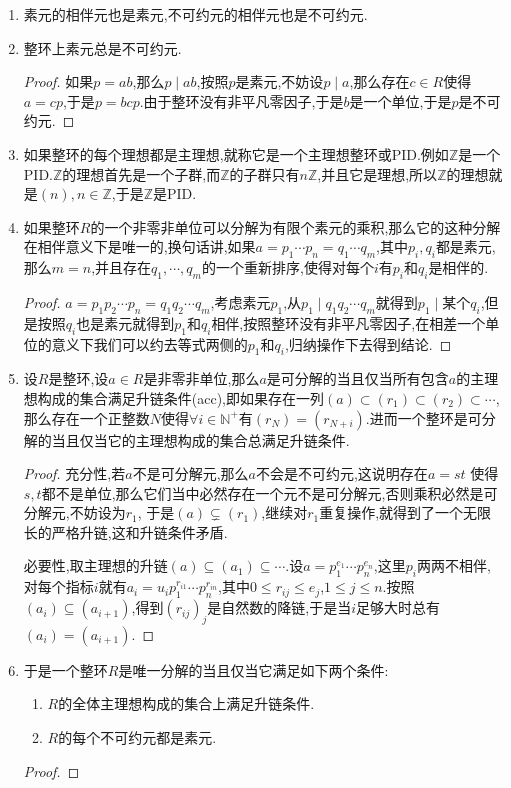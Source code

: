 \begin{enumerate}
	\item 素元的相伴元也是素元,不可约元的相伴元也是不可约元.
	\item 整环上素元总是不可约元.
	\begin{proof}
		
		如果$p=ab$,那么$p\mid ab$,按照$p$是素元,不妨设$p\mid a$,那么存在$c\in R$使得$a=cp$,于是$p=bcp$.由于整环没有非平凡零因子,于是$b$是一个单位,于是$p$是不可约元.
	\end{proof}
    \item 如果整环的每个理想都是主理想,就称它是一个主理想整环或PID.例如$\mathbb{Z}$是一个PID.$\mathbb{Z}$的理想首先是一个子群,而$\mathbb{Z}$的子群只有$n\mathbb{Z}$,并且它是理想,所以$\mathbb{Z}$的理想就是$(n),n\in \mathbb{Z}$,于是$\mathbb{Z}$是PID.
    \item 如果整环$R$的一个非零非单位可以分解为有限个素元的乘积,那么它的这种分解在相伴意义下是唯一的,换句话讲,如果$a=p_1\cdots p_n=q_1\cdots q_m$,其中$p_i,q_i$都是素元,那么$m=n$,并且存在$q_1,\cdots,q_m$的一个重新排序,使得对每个$i$有$p_i$和$q_i$是相伴的.
    \begin{proof}
    	
    	$a=p_1p_2\cdots p_n=q_1q_2\cdots q_m$,考虑素元$p_1$,从$p_1\mid q_1q_2\cdots q_m$就得到$p_1\mid$某个$q_i$,但是按照$q_i$也是素元就得到$p_1$和$q_i$相伴,按照整环没有非平凡零因子,在相差一个单位的意义下我们可以约去等式两侧的$p_1$和$q_i$,归纳操作下去得到结论.
    \end{proof}
    \item 设$R$是整环,设$a\in R$是非零非单位,那么$a$是可分解的当且仅当所有包含$a$的主理想构成的集合满足升链条件(acc),即如果存在一列$(a)\subset (r_1)\subset (r_2)\subset\cdots$,那么存在一个正整数$N$使得$\forall i\in\mathbb{N}^+$有$(r_N)=(r_{N+i})$.进而一个整环是可分解的当且仅当它的主理想构成的集合总满足升链条件.
    \begin{proof}
    	
    	充分性,若$a$不是可分解元,那么$a$不会是不可约元,这说明存在$a=st$ 使得$s,t$都不是单位,那么它们当中必然存在一个元不是可分解元,否则乘积必然是可分解元,不妨设为$r_1$, 于是$(a)\subsetneq(r_1)$,继续对$r_1$重复操作,就得到了一个无限长的严格升链,这和升链条件矛盾.
    	
    	\qquad
    	
    	必要性,取主理想的升链$(a)\subseteq(a_1)\subseteq\cdots$.设$a=p_1^{e_1}\cdots p_n^{e_n}$,这里$p_i$两两不相伴,对每个指标$i$就有$a_i=u_ip_1^{r_{i1}}\cdots p_n^{r_{in}}$,其中$0\le r_{ij}\le e_j$,$1\le j\le n$.按照$(a_i)\subseteq(a_{i+1})$,得到$(r_{ij})_j$是自然数的降链,于是当$i$足够大时总有$(a_i)=(a_{i+1})$.
    \end{proof}
    \item 于是一个整环$R$是唯一分解的当且仅当它满足如下两个条件:
    \begin{enumerate}
    	\item $R$的全体主理想构成的集合上满足升链条件.
    	\item $R$的每个不可约元都是素元.
    \end{enumerate}
    \begin{proof}
    	

\end{proof}
\end{enumerate}
